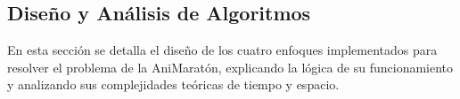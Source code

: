 \subsection{Diseño y Análisis de Algoritmos}
\label{subsec:diseno_analisis}

En esta sección se detalla el diseño de los cuatro enfoques implementados para resolver el problema de la AniMaratón, explicando la lógica de su funcionamiento y analizando sus complejidades teóricas de tiempo y espacio.



